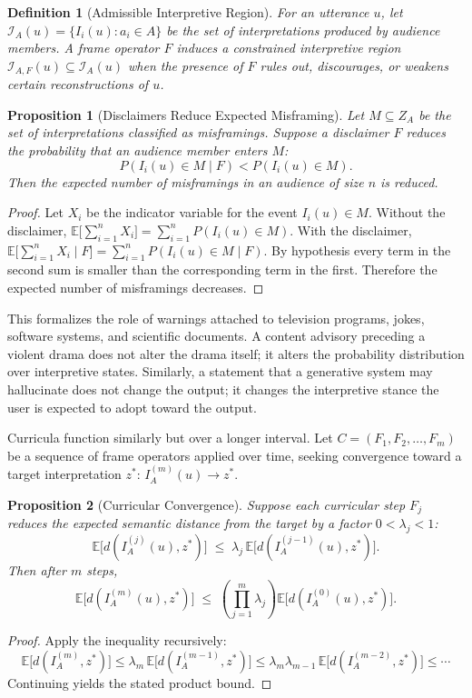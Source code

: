\documentclass[11pt]{article}
\theoremstyle{plain}
\newtheorem{definition}{Definition}[section]
\newtheorem{proposition}{Proposition}[section]
\begin{document}
\begin{definition}[Admissible Interpretive Region]
For an utterance $u$, let $\mathcal{I}_A(u) = \{I_i(u) : a_i \in A\}$ be the set of interpretations produced by audience members. A frame operator $F$ induces a constrained interpretive region $\mathcal{I}_{A,F}(u) \subseteq \mathcal{I}_A(u)$ when the presence of $F$ rules out, discourages, or weakens certain reconstructions of $u$.
\end{definition}

\begin{proposition}[Disclaimers Reduce Expected Misframing]
Let $M \subseteq Z_A$ be the set of interpretations classified as misframings. Suppose a disclaimer $F$ reduces the probability that an audience member enters $M$:
\[
P(I_i(u) \in M \mid F) < P(I_i(u) \in M).
\]
Then the expected number of misframings in an audience of size $n$ is reduced.
\end{proposition}
\begin{proof}
Let $X_i$ be the indicator variable for the event $I_i(u) \in M$. Without the disclaimer, $\mathbb{E}\big[\sum_{i=1}^n X_i\big] = \sum_{i=1}^n P(I_i(u)\in M)$. With the disclaimer, $\mathbb{E}\big[\sum_{i=1}^n X_i \mid F\big] = \sum_{i=1}^n P(I_i(u)\in M \mid F)$. By hypothesis every term in the second sum is smaller than the corresponding term in the first. Therefore the expected number of misframings decreases.
\end{proof}

This formalizes the role of warnings attached to television programs, jokes, software systems, and scientific documents. A content advisory preceding a violent drama does not alter the drama itself; it alters the probability distribution over interpretive states. Similarly, a statement that a generative system may hallucinate does not change the output; it changes the interpretive stance the user is expected to adopt toward the output.

Curricula function similarly but over a longer interval. Let $C = (F_1,F_2,\ldots,F_m)$ be a sequence of frame operators applied over time, seeking convergence toward a target interpretation $z^\ast$: $I_A^{(m)}(u) \to z^\ast$.

\begin{proposition}[Curricular Convergence]
Suppose each curricular step $F_j$ reduces the expected semantic distance from the target by a factor $0 < \lambda_j < 1$:
\[
\mathbb{E}\big[d(I_A^{(j)}(u), z^\ast)\big] \;\leq\; \lambda_j\, \mathbb{E}\big[d(I_A^{(j-1)}(u), z^\ast)\big].
\]
Then after $m$ steps,
\[
\mathbb{E}\big[d(I_A^{(m)}(u), z^\ast)\big] \;\leq\; \left(\prod_{j=1}^m \lambda_j\right) \mathbb{E}\big[d(I_A^{(0)}(u), z^\ast)\big].
\]
\end{proposition}
\begin{proof}
Apply the inequality recursively:
\[
\mathbb{E}\big[d(I_A^{(m)},z^\ast)\big] \leq \lambda_m\, \mathbb{E}\big[d(I_A^{(m-1)},z^\ast)\big] \leq \lambda_m\lambda_{m-1}\, \mathbb{E}\big[d(I_A^{(m-2)},z^\ast)\big] \leq \cdots
\]
Continuing yields the stated product bound.
\end{proof}
\end{document}

